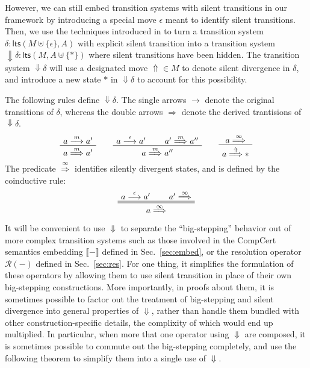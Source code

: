 \documentclass[11pt]{article}
\newcommand{\kw}[1]{{\mathsf{#1}}}
\begin{document}
However,
we can still embed transition systems with silent transitions
in our framework by introducing a special move $\epsilon$
meant to identify silent transitions.
Then, we use the techniques introduced in \cite{coindbs}
to turn a transition system
$\delta : \kw{lts}(M \uplus \{\epsilon\}, A)$
with explicit silent transition into a transition system
${\Downarrow} \delta : \kw{lts}(M, A \uplus \{ * \})$
where silent transitions have been hidden.
The transition system ${\Downarrow} \delta$
will use a designated move ${\Uparrow} \in M$
to denote silent divergence in $\delta$,
and introduce a new state $*$ in ${\Downarrow}\delta$
to account for this possibility.

The following rules define ${\Downarrow} \delta$.
The single arrows $\rightarrow$ denote
the original transitions of $\delta$,
whereas the double arrows $\Rightarrow$ denote
the derived trantisions of ${\Downarrow} \delta$.
\[
    \AxiomC{$a \stackrel{m}{\longrightarrow} a'$}
    \UnaryInfC{$a \stackrel{m}{\Longrightarrow} a'$}
    \DisplayProof
    \qquad
    \AxiomC{$a \stackrel{\epsilon}{\longrightarrow} a'$}
    \AxiomC{$a' \stackrel{m}{\Longrightarrow} a''$}
    \BinaryInfC{$a \stackrel{m}{\Longrightarrow} a''$}
    \DisplayProof
    \qquad
    \AxiomC{$a \stackrel{\infty}{\Longrightarrow}$}
    \UnaryInfC{$a \stackrel{\Uparrow}{\Longrightarrow} *$}
    \DisplayProof
\]
The predicate $\stackrel{\infty}{\Longrightarrow}$
identifies silently divergent states,
and is defined by the coinductive rule:
\[
    \AxiomC{$a \stackrel{\epsilon}{\longrightarrow} a'$}
    \AxiomC{$a' \stackrel{\infty}{\Longrightarrow}$}
    \doubleLine
    \BinaryInfC{$a \stackrel{\infty}{\Longrightarrow}$}
    \DisplayProof
\]

It will be convenient to use $\Downarrow$ to separate
the ``big-stepping'' behavior out of more complex transition systems
such as those involved in
the CompCert semantics embedding $\llbracket - \rrbracket$
defined in Sec.~\ref{sec:embed}, or
the resolution operator $\mathcal{R}(-)$
defined in Sec.~\ref{sec:res}.
For one thing,
it simplifies the formulation of these operators
by allowing them to use silent transition
in place of their own big-stepping constructions.
More importantly,
in proofs about them,
it is sometimes possible to factor out
the treatment of big-stepping and silent divergence
into general properties of $\Downarrow$,
rather than handle them bundled with other
construction-specific details,
the complixity of which would end up multiplied.
In particular,
when more that one operator using $\Downarrow$ are composed,
it is sometimes possible to commute out the big-stepping completely,
and use the following theorem to simplify them into
a single use of $\Downarrow$.
\end{document}
